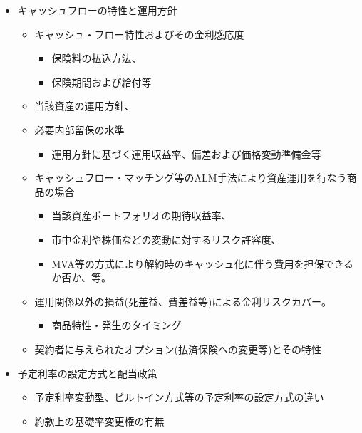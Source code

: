 \documentclass[]{article}
\begin{document}
\begin{itemize}
  \begin{itemize}
  \tightlist
  \item
    キャッシュフローの特性と運用方針

    \begin{itemize}
    \tightlist
    \item
      キャッシュ・フロー特性およびその金利感応度

      \begin{itemize}
      \tightlist
      \item
        保険料の払込方法、
      \item
        保険期間および給付等
      \end{itemize}
    \item
      当該資産の運用方針、
    \item
      必要内部留保の水準

      \begin{itemize}
      \tightlist
      \item
        運用方針に基づく運用収益率、偏差および価格変動準備金等
      \end{itemize}
    \item
      キャッシュフロー・マッチング等のALM手法により資産運用を行なう商品の場合

      \begin{itemize}
      \tightlist
      \item
        当該資産ポートフォリオの期待収益率、
      \item
        市中金利や株価などの変動に対するリスク許容度、
      \item
        MVA等の方式により解約時のキャッシュ化に伴う費用を担保できるか否か、等。
      \end{itemize}
    \item
      運用関係以外の損益(死差益、費差益等)による金利リスクカバー。

      \begin{itemize}
      \tightlist
      \item
        商品特性・発生のタイミング
      \end{itemize}
    \item
      契約者に与えられたオプション(払済保険への変更等)とその特性
    \end{itemize}
  \item
    予定利率の設定方式と配当政策

    \begin{itemize}
    \tightlist
    \item
      予定利率変動型、ビルトイン方式等の予定利率の設定方式の違い
    \item
      約款上の基礎率変更権の有無


\end{itemize}
\end{itemize}
\end{itemize}
\end{document}
